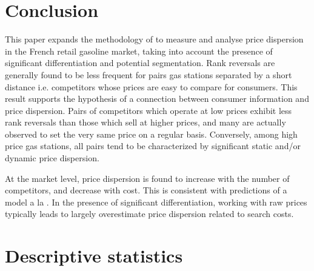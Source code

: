 \documentclass[english]{article}
\begin{document}
\section{Conclusion}

This paper expands the methodology of \cite{TAP11} to measure and analyse price dispersion in the French retail gasoline market, taking into account the presence of significant differentiation and potential segmentation. Rank reversals are generally found to be less frequent for pairs gas stations separated by a short distance i.e. competitors whose prices are easy to compare for consumers. This result supports the hypothesis of a connection between consumer information and price dispersion. Pairs of competitors which operate at low prices exhibit less rank reversals than those which sell at higher prices, and many are actually observed to set the very same price on a regular basis. Conversely, among high price gas stations, all pairs tend to be characterized by significant static and/or dynamic price dispersion. 

At the market level, price dispersion is found to increase with the number of competitors, and decrease with cost. This is consistent with predictions of a model a la \cite{VAR80}. In the presence of significant differentiation, working with raw prices typically leads to largely overestimate price dispersion related to search costs.


\newpage


\newpage

\appendix

\section{Descriptive statistics}
\end{document}
